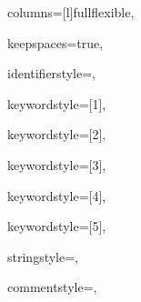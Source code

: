 {%
columns=[l]fullflexible,

keepspaces=true,

identifierstyle={\ttfamily\color{black}},

keywordstyle=[1]{\ttfamily\color{dkviolet}},

keywordstyle=[2]{\ttfamily\color{dkgreen}},

keywordstyle=[3]{\ttfamily\color{lightblue}},

keywordstyle=[4]{\ttfamily\color{dkblue}},

keywordstyle=[5]{\ttfamily\color{red}},



stringstyle=\ttfamily,

commentstyle={\rmfamily\color{brick}},

}
